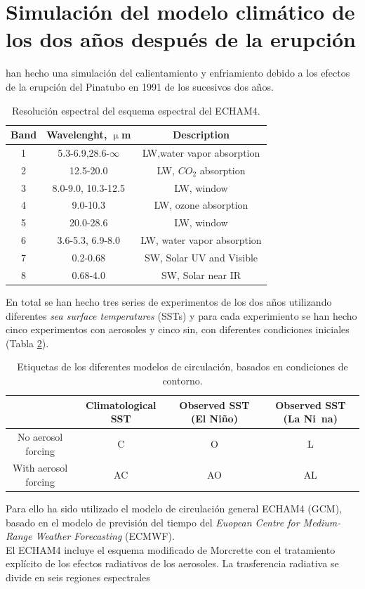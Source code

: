 \documentclass[a4apaper,twocolumn,10pt]{article}
\begin{document}
\section{Simulaci\'on del modelo clim\'atico de los dos a\~nos despu\'es de la erupci\'on}
\cite{kirchner1999climate} han hecho una simulaci\'on del calientamiento y enfriamiento debido a los efectos de la erupci\'on del Pinatubo en 1991 de los sucesivos dos a\~nos. 
\begin{table}[b]
\centering
\begin{tabular}{c|c|c}
Band&Wavelenght, $\upmu$m&Description \\ \hline
1&5.3-6.9,28.6-$\infty$&LW,water vapor absorption \\
2&12.5-20.0&LW, $CO_{2}$ absorption\\
3&8.0-9.0, 10.3-12.5&LW, window \\
4&9.0-10.3&LW, ozone absorption \\
5&20.0-28.6&LW, window \\
6&3.6-5.3, 6.9-8.0&LW, water vapor absorption \\
7&0.2-0.68&SW, Solar UV and Visible \\
8&0.68-4.0&SW, Solar near IR \\ \hline
\end{tabular}
\caption{Resoluci\'on espectral del esquema espectral del ECHAM4.} \label{tlb:Tabla1}
\end{table}
En total se han hecho tres series de experimentos de los dos a\~nos utilizando diferentes \textit{sea surface temperatures} (SSTs) y para cada experimiento se han hecho cinco experimentos con aerosoles y cinco sin, con diferentes condiciones iniciales (Tabla \ref{tlb:Tabla2}).
\begin{table}[t]
\centering
\begin{tabular}{c|c|c|c}
&Climatological SST&Observed SST (El Ni\~no)&Observed SST (La Ni~na) \\ \hline
No aerosol forcing&C&O&L\\
With aerosol forcing&AC&AO&AL\\ \hline
\end{tabular}
\caption{Etiquetas de los diferentes modelos de circulaci\'on, basados en condiciones de contorno.} \label{tlb:Tabla2}
\end{table}
Para ello ha sido utilizado el modelo de circulaci\'on general ECHAM4 (GCM), basado en el modelo de previsi\'on del tiempo del \textit{Euopean Centre for Medium-Range Weather Forecasting} (ECMWF). \\El ECHAM4 incluye el esquema modificado de Morcrette con el tratamiento expl\'icito de los efectos radiativos de los aerosoles. La trasferencia radiativa se divide en seis regiones espectrales 
\end{document}
